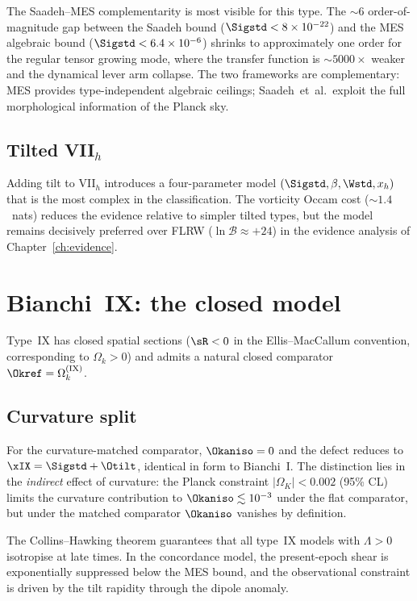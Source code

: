 The Saadeh--MES complementarity is most visible for this type.
The $\sim 6$ order-of-magnitude gap between the Saadeh bound
($\Sigstd < 8 \times 10^{-22}$) and the MES algebraic bound
($\Sigstd < 6.4 \times 10^{-6}$) shrinks to approximately one
order for the regular tensor growing mode, where the transfer
function is $\sim 5000\times$ weaker and the dynamical lever arm
collapse.  The two frameworks are complementary: MES provides
type-independent algebraic ceilings; Saadeh~et~al.\ exploit
the full morphological information of the Planck sky.


\subsection{Tilted VII$_h$}\label{sec:VIIh-tilted}

Adding tilt to VII$_h$ introduces a four-parameter model
$(\Sigstd, \beta, \Wstd, x_h)$ that is the most complex in
the classification.  The vorticity Occam cost
($\sim 1.4$~nats) reduces the evidence relative to simpler
tilted types, but the model remains decisively preferred over
FLRW ($\ln\mathcal{B} \approx +24$) in the evidence analysis
of Chapter~\ref{ch:evidence}.


\section{Bianchi~IX: the closed model}\label{sec:BIX}

Type~IX has closed spatial sections ($\sR < 0$ in the
Ellis--MacCallum convention, corresponding to $\Omega_k > 0$)
and admits a natural closed comparator
$\Okref = \Omega_k^{(\mathrm{IX})}$.


\subsection{Curvature split}

For the curvature-matched comparator, $\Okaniso = 0$ and the
defect reduces to $\xIX = \Sigstd + \Otilt$, identical in
form to Bianchi~I.  The distinction lies in the \emph{indirect}
effect of curvature: the Planck constraint
$|\Omega_K| < 0.002$ (95\% CL) limits the curvature contribution
to $\Okaniso \lesssim 10^{-3}$ under the flat comparator, but
under the matched comparator $\Okaniso$ vanishes by definition.

The Collins--Hawking theorem guarantees that all type~IX models
with $\Lambda > 0$ isotropise at late times.  In the concordance
model, the present-epoch shear is exponentially suppressed below
the MES bound, and the observational constraint is driven by the
tilt rapidity through the dipole anomaly.


